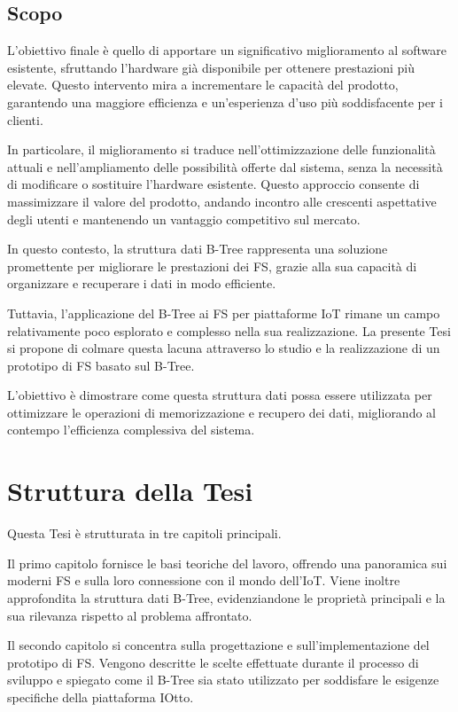 \documentclass[12pt,a4paper,openright,twoside]{book}
\begin{document}
        \subsection{Scopo}

            L’obiettivo finale è quello di apportare un significativo miglioramento al software esistente, sfruttando l’hardware già disponibile per ottenere prestazioni più elevate. Questo intervento mira a incrementare le capacità del prodotto, garantendo una maggiore efficienza e un’esperienza d’uso più soddisfacente per i clienti.

            In particolare, il miglioramento si traduce nell’ottimizzazione delle funzionalità attuali e nell’ampliamento delle possibilità offerte dal sistema, senza la necessità di modificare o sostituire l’hardware esistente. Questo approccio consente di massimizzare il valore del prodotto, andando incontro alle crescenti aspettative degli utenti e mantenendo un vantaggio competitivo sul mercato.

    In questo contesto, la struttura dati B-Tree rappresenta una soluzione promettente per migliorare le prestazioni dei \ac{FS}, grazie alla sua capacità di organizzare e recuperare i dati in modo efficiente.

    Tuttavia, l’applicazione del B-Tree ai \ac{FS} per piattaforme \ac{IoT} rimane un campo relativamente poco esplorato e complesso nella sua realizzazione.
    La presente Tesi si propone di colmare questa lacuna attraverso lo studio e la realizzazione di un prototipo di \ac{FS} basato sul B-Tree.

    L’obiettivo è dimostrare come questa struttura dati possa essere utilizzata per ottimizzare le operazioni di memorizzazione e recupero dei dati, migliorando al contempo l’efficienza complessiva del sistema.

    \section{Struttura della Tesi}

        Questa Tesi è strutturata in tre capitoli principali.

        Il primo capitolo fornisce le basi teoriche del lavoro, offrendo una panoramica sui moderni \ac{FS} e sulla loro connessione con il mondo dell’\ac{IoT}.
        Viene inoltre approfondita la struttura dati B-Tree, evidenziandone le proprietà principali e la sua rilevanza rispetto al problema affrontato.

        Il secondo capitolo si concentra sulla progettazione e sull’implementazione del prototipo di \ac{FS}.
        Vengono descritte le scelte effettuate durante il processo di sviluppo e spiegato come il B-Tree sia stato utilizzato per soddisfare le esigenze specifiche della piattaforma IOtto.
\end{document}
